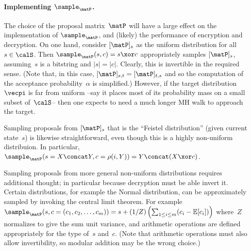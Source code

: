 \paragraph{Implementing $\sample_\matP$.} The choice of the proposal
matrix~$\matP$ will have a large effect on the implementation of
$\sample_\matP$, and (likely) the performance of encryption and
decryption.  On one hand, consider $[\matP]_s$ as the uniform
distribution for all~$s \in \calS$.  Then $\sample_\matP(s,c) = s \xor
c$ appropriately samples $[\matP]_s$, assuming~$s$ is a bitstring and
$|s|=|c|$.  Clearly, this is invertible in the required sense.  (Note
that, in this case, $[\matP]_{s,t}=[\matP]_{t,s}$ and so the
computation of the acceptance probability~$\alpha$ is simplified.)
However, if the target distribution~$\vecpi$ is far from uniform --say
it places most of its probability mass on a small subset of~$\calS$--
then one expects to need a much longer MH walk to approach the
target. 

Sampling proposals from $[\matP]_s$ that is the ``Feistel distribution'' (given current state~$s$) 
is likewise
straightforward, even though this is a highly non-uniform
distribuion.  In particular, $\sample_\matP(s=X\concat Y,
c=\rho(i,Y))= Y \concat (X \xor c)$.

Sampling proposals from more general non-uniform distributions
requires additional thought; in particular because decryption must be able invert it.  Certain distributions, for example the Normal distribution, can be approximately sampled by invoking the central limit theorem.  For example $\sample_\matP(s,c=(c_1,c_2,\ldots,c_m)) = s + (1/Z)\left( \sum_{1 \leq i \leq m} (c_{i}-\mathbb{E}[c_{i}]) \right)$ where~$Z$ normalizes to give the sum unit variance, and arithmetic operations are defined appropriately for the type of~$s$ and~$c$.  (Note that arithmetic operations must also allow invertibility, so modular addition may be the wrong choice.)  


